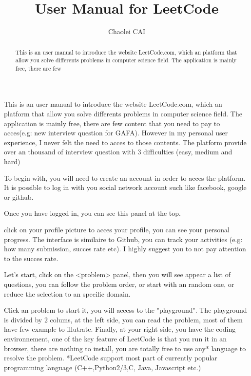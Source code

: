 \documentclass[12pt, letterpaper]{article}
\title{User Manual for LeetCode}
\author{Chaolei CAI}
\begin{document}
\begin{titlepage}
    \maketitle
\end{titlepage}

\begin{abstract}
    This is an user manual to introduce the website LeetCode.com, which an platform that allow you solve differents problems in computer science field. The application is mainly free, there are few

\end{abstract}
This is an user manual to introduce the website LeetCode.com, which an platform that allow you solve differents problems in computer science field. The application is mainly free, there are few content that you need to pay to acces(e.g: new interview question for GAFA). However in my personal user experience, I never felt the need to acces to those contents. The platform provide over an thousand of interview question with 3 difficulties (easy, medium and hard)

To begin with, you will need to create an account in order to acces the platform. It is possible to log in with you social network account such like facebook, google or github.

Once you have logged in, you can see this panel at the top.

click on your profile picture to acces your profile, you can see your personal progress. The interface is similaire to Github, you can track your activities (e.g: how many submission, succes rate etc).
I highly suggest you to not pay attention to the succes rate.

Let's start,
click on the <problem> panel, then you will see appear a list of questions, you can follow the problem order, or start with an random one, or reduce the selection to an specific domain.

Click an problem to start it, you will access to the "playground".
The playground is divided by 2 colums, at the left side, you can read the problem, most of them have few example to illutrate. Finally, at your right side, you have the coding environnement, one of the key feature of LeetCode is that you run it in an browser, there are nothing to install, you are totally free to use any* language to resolve the problem.
*LeetCode support most part of currently popular programming language (C++,Python2/3,C, Java, Javascript etc.)
\end{document}
